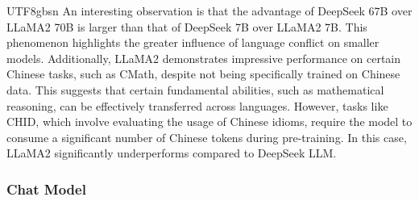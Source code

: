 \documentclass[11pt, a4paper, logo, copyright, nonumbering]{deepseek}
\begin{document}
\begin{CJK*}{UTF8}{gbsn}
An interesting observation is that the advantage of DeepSeek 67B over LLaMA2 70B is larger than that of DeepSeek 7B over LLaMA2 7B. This phenomenon highlights the greater influence of language conflict on smaller models. Additionally, LLaMA2 demonstrates impressive performance on certain Chinese tasks, such as CMath, despite not being specifically trained on Chinese data. This suggests that certain fundamental abilities, such as mathematical reasoning, can be effectively transferred across languages. However, tasks like CHID, which involve evaluating the usage of Chinese idioms, require the model to consume a significant number of Chinese tokens during pre-training. In this case, LLaMA2 significantly underperforms compared to DeepSeek LLM.


\subsubsection{Chat Model}

\begin{table}[t]
    \centering \small
{}
\end{table}
\end{CJK*}
\end{document}

